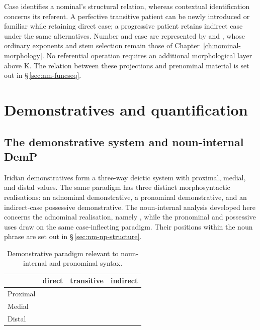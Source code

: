 Case identifies a nominal's structural relation, whereas contextual
identification concerns its referent. A perfective transitive patient can
be newly introduced or familiar while retaining direct case; a progressive
patient retains indirect case under the same alternatives. Number and
case are represented by  and , whose ordinary
exponents and stem selection remain those of Chapter~\ref{ch:nominal-morphology}.
No referential operation requires an additional morphological layer above K.
The relation between these projections and prenominal material is set out
in §\,\ref{sec:nm-funcseq}.

\FloatBarrier

\section{Demonstratives and quantification}
\label{sec:nm-upper}

\subsection{The demonstrative system and noun-internal DemP}
\label{sec:nm-dem}

Iridian demonstratives form a three-way deictic system with proximal, medial,
and distal values. The same paradigm has three distinct morphosyntactic
realisations: an adnominal demonstrative, a pronominal demonstrative, and an
indirect-case possessive demonstrative. The noun-internal analysis developed
here concerns the adnominal realisation, namely , while the pronominal and possessive uses draw on the same
case-inflecting paradigm. Their positions within the noun phrase are set out
in §\,\ref{sec:nm-np-structure}.

\begin{table}[ht]
  \footnotesize
  \caption{Demonstrative paradigm relevant to noun-internal and
  pronominal syntax.}\label{tab:nm-dem-paradigm}
  \begin{tabularx}{0.7\textwidth}{L l l l}
    \toprule
                 & {\sc direct} & {\sc transitive} & {\sc indirect} \\
    \midrule
    Proximal     &   &   &  \\
    Medial       &  &  &  \\
    Distal       &    &  &  \\
    \bottomrule
  \end{tabularx}
\end{table}

